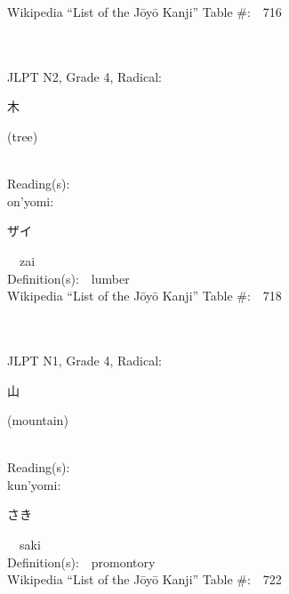 \begin{multicols}{2}
Wikipedia ``List of the J\=oy\=o Kanji'' Table \#:\ \ 716 \\
\ \ \\
{\fontsize{34pt}{40pt}  }\ \ \\  %
{JLPT N2, Grade 4, Radical:\ \ {\begin{CJK}{UTF8}{min} 木 \end{CJK}} (tree) } \\
Reading(s):\ \ \\
{\hspace*{1em}}on'yomi:\ \ \\
{\hspace*{2em}}{\begin{CJK}{UTF8}{min} ザイ \end{CJK}}\ \ zai\ \ \\
Definition(s):\ \ lumber \\
Wikipedia ``List of the J\=oy\=o Kanji'' Table \#:\ \ 718 \\
\ \ \\
{\fontsize{34pt}{40pt}  }\ \ \\  %
{JLPT N1, Grade 4, Radical:\ \ {\begin{CJK}{UTF8}{min} 山 \end{CJK}} (mountain) } \\
Reading(s):\ \ \\
{\hspace*{1em}}kun'yomi:\ \ \\
{\hspace*{2em}}{\begin{CJK}{UTF8}{min} さき \end{CJK}}\ \ saki\ \ \\
Definition(s):\ \ promontory \\
Wikipedia ``List of the J\=oy\=o Kanji'' Table \#:\ \ 722 \\
\ \ \\
{\fontsize{34pt}{40pt}  }\ \ \\  %

\end{multicols}
